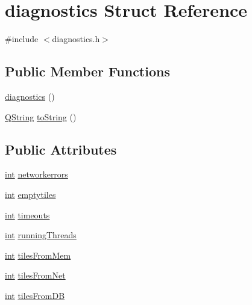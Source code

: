 \hypertarget{structdiagnostics}{\section{diagnostics Struct Reference}
\label{structdiagnostics}
}


{\ttfamily \#include $<$diagnostics.\-h$>$}

\subsection*{Public Member Functions}
\begin{DoxyCompactItemize}
\item 
\hyperlink{group___o_p_map_widget_ga9fb2a8142ddf0bad7dc111d9f792f456}{diagnostics} ()
\item 
\hyperlink{group___u_a_v_objects_plugin_gab9d252f49c333c94a72f97ce3105a32d}{Q\-String} \hyperlink{group___o_p_map_widget_gac7639db946ccc37305c9a915ab7816cc}{to\-String} ()
\end{DoxyCompactItemize}
\subsection*{Public Attributes}
\begin{DoxyCompactItemize}
\item 
\hyperlink{ioapi_8h_a787fa3cf048117ba7123753c1e74fcd6}{int} \hyperlink{group___o_p_map_widget_ga818b2b21d317fac5193b04d2c0e32c82}{networkerrors}
\item 
\hyperlink{ioapi_8h_a787fa3cf048117ba7123753c1e74fcd6}{int} \hyperlink{group___o_p_map_widget_ga34fe3ec60c45212857e46367009f0729}{emptytiles}
\item 
\hyperlink{ioapi_8h_a787fa3cf048117ba7123753c1e74fcd6}{int} \hyperlink{group___o_p_map_widget_ga9f4f4d5bc0d01d665175028f4ea970c7}{timeouts}
\item 
\hyperlink{ioapi_8h_a787fa3cf048117ba7123753c1e74fcd6}{int} \hyperlink{group___o_p_map_widget_gae7dc693c162396310de691f67b4b0e99}{running\-Threads}
\item 
\hyperlink{ioapi_8h_a787fa3cf048117ba7123753c1e74fcd6}{int} \hyperlink{group___o_p_map_widget_gade3ce38dee3744ba9c72ca0dce86b0d4}{tiles\-From\-Mem}
\item 
\hyperlink{ioapi_8h_a787fa3cf048117ba7123753c1e74fcd6}{int} \hyperlink{group___o_p_map_widget_ga6750459fc54ae81a5870b841aff67c6c}{tiles\-From\-Net}
\item 
\hyperlink{ioapi_8h_a787fa3cf048117ba7123753c1e74fcd6}{int} \hyperlink{group___o_p_map_widget_ga1a83442bf140e95b84931d57cc849449}{tiles\-From\-D\-B}
\end{DoxyCompactItemize}



